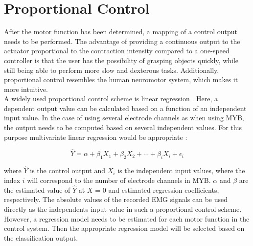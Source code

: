 \section{Proportional Control}
After the motor function has been determined, a mapping of a control output needs to be performed. The advantage of providing a continuous output to the actuator proportional to the contraction intensity compared to a one-speed controller is that the user has the possibility of grasping objects quickly, while still being able to perform more slow and dexterous tasks. Additionally, proportional control resembles the human neuromotor system, which makes it more intuitive. \cite{Fougner2012} \\
A widely used proportional control scheme is linear regression \cite{Fougner2012}. Here, a dependent output value can be calculated based on a function of an independent input value. In the case of using several electrode channels as when using MYB, the output needs to be computed based on several independent values. For this purpose multivariate linear regression would be appropriate \cite{Zar2009}:

\begin{equation}
	\hat{Y} = \alpha+\beta_{1}X_{1}+\beta_{2}X_{2}+\cdots+\beta_{i}X_{i}+\epsilon_{i}
\end{equation}

where $\hat{Y}$ is the control output and $X_{i}$ is the independent input values, where the index $i$ will correspond to the number of electrode channels in MYB. $\alpha$ and $\beta$ are the estimated value of $\hat{Y}$ at $X$ = 0 and estimated regression coefficients, respectively. The absolute values of the recorded EMG signals can be used directly as the independents input value in such a proportional control scheme. However, a regression model needs to be estimated for each motor function in the control system. Then the appropriate regression model will be selected based on the classification output.  